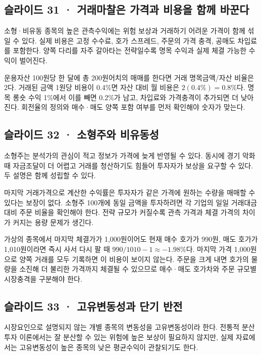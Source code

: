 \documentclass[11pt,a4paper]{article}
\begin{document}
\subsection{슬라이드 31 · 거래마찰은 가격과 비용을 함께 바꾼다}
소형·비유동 종목의 높은 관측수익에는 위험 보상과 거래하기 어려운 가격이 함께 섞일 수 있다. 실제 비용은 고정 수수료, 호가 스프레드, 주문의 가격 충격, 공매도 차입료를 포함한다. 양쪽 다리를 자주 갈아타는 전략일수록 명목 수익과 실제 체결 가능한 수익이 벌어진다.\par

운용자산 100원당 한 달에 총 200원어치의 매매를 한다면 거래 명목금액/자산 비율은 2다. 거래된 금액 1원당 비용이 0.4\%면 자산 대비 월 비용은 $2(0.4\%)=0.8\%$다. 명목 롱숏 수익 1\%에서 이를 빼면 0.2\%가 남고, 차입료와 가격충격이 추가되면 더 낮아진다. 회전율의 정의와 매수·매도 양쪽 포함 여부를 먼저 확인해야 숫자가 맞는다.\par

\subsection{슬라이드 32 · 소형주와 비유동성}
소형주는 분석가의 관심이 적고 정보가 가격에 늦게 반영될 수 있다. 동시에 경기 악화 때 자금조달이 더 어렵고 거래를 청산하기도 힘들어 투자자가 보상을 요구할 수 있다. 두 설명은 함께 성립할 수 있다.\par

마지막 거래가격으로 계산한 수익률은 투자자가 같은 가격에 원하는 수량을 매매할 수 있다는 보장이 없다. 소형주 100개에 동일 금액을 투자하려면 각 기업의 일일 거래대금 대비 주문 비율을 확인해야 한다. 전략 규모가 커질수록 관측 가격과 체결 가격의 차이가 커지는 용량 문제가 생긴다.\par

가상의 종목에서 마지막 체결가가 1,000원이어도 현재 매수 호가가 990원, 매도 호가가 1,010원이라면 즉시 사서 다시 팔 때 $990/1010-1\approx-1.98\%$다. 마지막 가격 1,000원으로 양쪽 거래를 모두 기록하면 이 비용이 보이지 않는다. 주문을 크게 내면 호가의 물량을 소진해 더 불리한 가격까지 체결될 수 있으므로 매수·매도 호가차와 주문 규모별 시장충격을 구분해야 한다.\par

\subsection{슬라이드 33 · 고유변동성과 단기 반전}
시장요인으로 설명되지 않는 개별 종목의 변동성을 고유변동성이라 한다. 전통적 분산투자 이론에서는 잘 분산할 수 있는 위험에 높은 보상이 필요하지 않지만, 실제 자료에서는 고유변동성이 높은 종목의 낮은 평균수익이 관찰되기도 한다.\par
\end{document}
